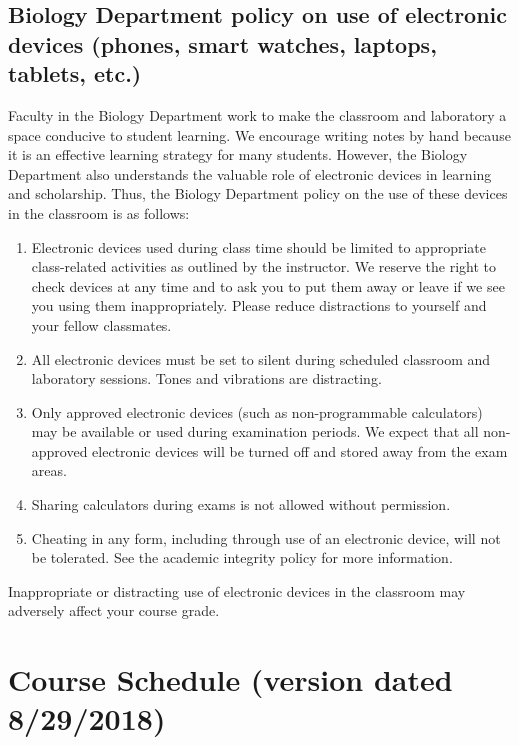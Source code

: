 \documentclass{tufte-handout}
\begin{document}
\begin{fullwidth}

\subsection{Biology Department policy on use of electronic devices (phones, smart watches, laptops, tablets, etc.)}

Faculty in the Biology Department work to make the classroom and laboratory a space conducive to student learning. We encourage writing notes by hand because it is an effective learning strategy for many students. However, the Biology Department also understands the valuable role of electronic devices in learning and scholarship. Thus, the Biology Department policy on the use of these devices in the classroom is as follows:


\begin{enumerate}
\item Electronic devices used during class time should be limited to appropriate class-related activities as outlined by the instructor. We reserve the right to check devices at any time and to ask you to put them away or leave if we see you using them inappropriately. Please reduce distractions to yourself and your fellow classmates.
\item All electronic devices must be set to silent during scheduled classroom and laboratory sessions. Tones and vibrations are distracting.
\item Only approved electronic devices (such as non-programmable calculators) may be available or used during examination periods. We expect that all non-approved electronic devices will be turned off and stored away from the exam areas.
\item Sharing calculators during exams is not allowed without permission. 
\item Cheating in any form, including through use of an electronic device, will not be tolerated. See the academic integrity policy for more information.
\end{enumerate}

Inappropriate or distracting use of electronic devices in the classroom may adversely affect your course grade. 





\newpage

\section{Course Schedule (version dated 8/29/2018)}


\end{fullwidth}
\end{document}

